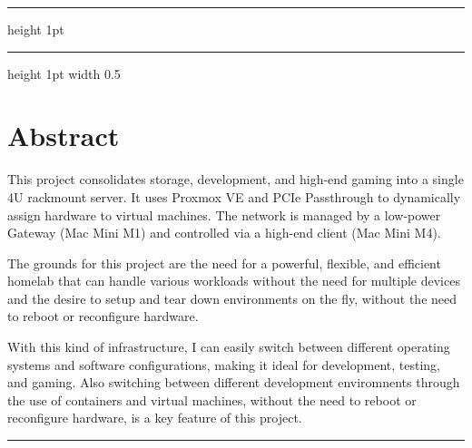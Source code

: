 \documentclass[a4paper, 11pt, twoside]{report}
\newcommand{\blankpage}{
    \clearpage
    \thispagestyle{empty} %
    \hbox{}               %
    \newpage
}
\begin{document}
\begin{titlepage}
\vspace{35pt}
\hrule height 1pt %
\vspace{8pt}

\noindent
{}
\vspace{5cm} %
\hrule height 1pt width 0.5\textwidth %
\vspace{8pt}
\noindent
\begin{minipage}[t]{\textwidth}
    \vspace{0pt}
\end{minipage}
\end{titlepage}
\restoregeometry

\blankpage

\tableofcontents
\newpage

\listoffigures
\listoftables
\newpage

\blankpage

\chapter{Abstract}

This project consolidates storage, development, and high-end gaming into a single 4U rackmount server.
It uses Proxmox VE and PCIe Passthrough to dynamically assign hardware to virtual machines. 
The network is managed by a low-power Gateway (Mac Mini M1) and controlled via a high-end client
(Mac Mini M4).

The grounds for this project are the need for a powerful, flexible, and efficient \gls{homelab} that can handle various
workloads without the need for multiple devices and the desire to setup and tear down environments on the fly, without 
the need to reboot or reconfigure hardware.

With this kind of infrastructure, I can easily switch between different operating systems and software configurations,
making it ideal for development, testing, and gaming.
Also switching between different development enviromnents through the use of containers and virtual machines, without 
the need to reboot or reconfigure hardware, is a key feature of this project.

\vspace{1cm}
\noindent\rule{\textwidth}{0.5pt}
\vspace{1cm}
\end{document}
